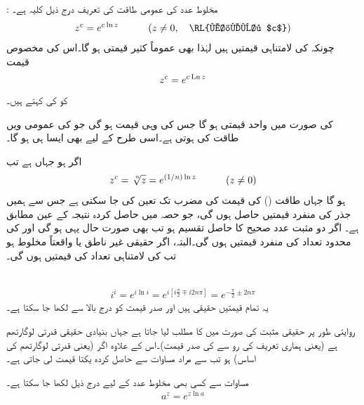 : مخلوط عدد  کی عمومی طاقت کی تعریف درج ذیل کلیہ ہے۔
\begin{align}\label{مساوات_مخلوط_لوگارتھم_ث}
z^c=e^{c\ln z}\quad \quad \quad (z\ne 0, \quad \text{\RL{مخلوط $c$}})
\end{align}
چونکہ  کی لامتناہی قیمتیں ہیں لہٰذا  بھی عموماً کثیر قیمتی ہو گا۔اس کی مخصوص قیمت
\begin{align*}
z^c=e^{c\operatorname{Ln} z}
\end{align*}
کو  کی  کہتے ہیں۔

 کی صورت میں  واحد قیمتی ہو گا جس کی وہی قیمت ہو گی جو   کی عمومی  ویں طاقت کی ہوتی ہے۔اسی طرح  کے لیے بھی ایسا ہی ہو گا۔

اگر  ہو جہاں  ہے تب
\begin{align*}
z^c=\sqrt[\leftroot{-2}\uproot{2}n]{z}=e^{(1/n)\ln z}\quad \quad \quad (z\ne 0)
\end{align*}
ہو گا جہاں طاقت () کی قیمت  کی مضرب تک تعین کی جا سکتی ہے جس سے ہمیں جذر کی  منفرد قیمتیں حاصل ہوں گی، جو حصہ  میں حاصل کردہ نتیجہ کے عین مطابق ہے۔ اگر  دو مثبت عدد صحیح کا حاصل تقسیم ہو تب بھی صورت حال یہی ہو گی اور  کی محدود تعداد کی منفرد قیمتیں ہوں گی۔البتہ، اگر  حقیقی غیر ناطق یا واقعتاً مخلوط ہو تب  کی لامتناہی تعداد کی قیمتیں ہوں گی۔ 

\quad {}\\
\begin{align*}
i^i=e^{i\ln i}=e^{i[i\tfrac{\pi}{2}\mp i2n\pi]}=e^{-\tfrac{\pi}{2}\pm 2n\pi}
\end{align*}
یہ تمام قیمتیں حقیقی ہیں اور صدر قیمت  کو درج بالا سے  لکھا جا سکتا ہے۔

روایتی طور پر حقیقی مثبت  کی صورت میں  کا مطلب  لیا جاتا ہے جہاں  بنیادی حقیقی قدرتی لوگارتھم ہے (یعنی ہماری تعریف کی رو سے   کی صدر قیمت)۔اس کے علاوہ اگر  (یعنی قدرتی لوگارتھم کی اساس) ہو تب  سے مراد مساوات  سے حاصل کردہ یکتا قیمت لی جاتی ہے۔

مساوات  سے کسی بھی مخلوط عدد  کے لیے درج ذیل لکھا جا سکتا ہے۔
\begin{align}\label{مساوات_مخلوط_لوگارتھم_ج}
a^z=e^{z\ln a}
\end{align}

